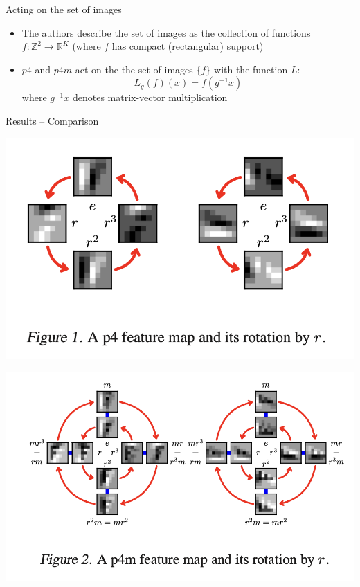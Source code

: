 \documentclass{beamer}
\newcommand{\R}{\mathbb{R}}
\newcommand{\Z}{\mathbb{Z}}
\begin{document}
\begin{frame}{Acting on the set of images}
    \begin{itemize}
        \item The authors describe the set of images as the collection of functions $f: \Z^2 \to \R^K$ (where $f$ has compact (rectangular) support)
        \item $p4$ and $p4m$ act on the the set of images $\{f\}$ with the function $L$:
        $$L_g(f)(x) = f(g^{-1}x)$$
        where $g^{-1}x$ denotes matrix-vector multiplication
    \end{itemize}
\end{frame}

\begin{frame}{Results -- Comparison}
    \begin{minipage}{0.5\textwidth}
        \includegraphics[width=\linewidth]{Screenshot 2024-01-13 at 11.28.41 AM.png} %
    \end{minipage}%
    \begin{minipage}{0.5\textwidth}
        \includegraphics[width=\linewidth]{Screenshot 2024-01-13 at 11.28.51 AM.png} %
    \end{minipage}
\end{frame}
\end{document}
